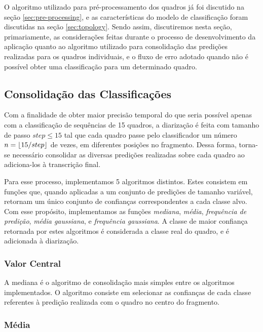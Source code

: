 O algoritmo utilizado para pré-processamento dos quadros já foi discutido na seção \ref{sec:pre-processing}, e as características do modelo de classificação foram discutidas na seção \ref{sec:topology}.
Sendo assim, discutiremos nesta seção, primariamente, as considerações feitas durante o processo de desenvolvimento da aplicação quanto ao algoritmo utilizado para consolidação das predições realizadas para os quadros individuais, e o fluxo de erro adotado quando não é possível obter uma classificação para um determinado quadro.

\subsection{Consolidação das Classificações}
\label{sec:class-commit}

Com a finalidade de obter maior precisão temporal do que seria possível apenas com a classificação de sequências de 15 quadros, a diarização é feita com tamanho de passo $step \leq 15$ tal que cada quadro passe pelo classificador um número $n = \left\lfloor 15 / step \right\rfloor$ de vezes, em diferentes posições no fragmento.
Dessa forma, torna-se necessário consolidar as diversas predições realizadas sobre cada quadro ao adiciona-los à transcrição final.

Para esse processo, implementamos 5 algoritmos distintos. 
Estes consistem em funções que, quando aplicadas a um conjunto de predições de tamanho variável, retornam um único conjunto de confianças correspondentes a cada classe alvo.
Com esse propósito, implementamos as funções \textit{mediana}, \textit{média}, \textit{frequência de predição}, \textit{média gaussiana}, e \textit{frequência gaussiana}.
A classe de maior confiança retornada por estes algoritmos é considerada a classe real do quadro, e é adicionada à diarização.

\subsubsection{Valor Central}

A mediana é o algoritmo de consolidação mais simples entre os algoritmos implementados.
O algoritmo consiste em selecionar as confianças de cada classe referentes à predição realizada com o quadro no centro do fragmento.

\subsubsection{Média}

